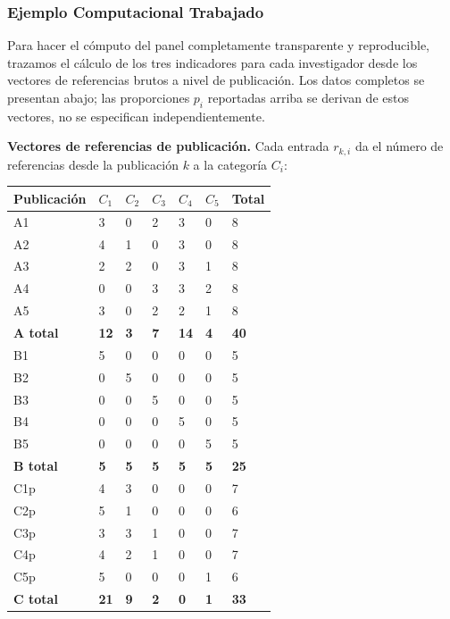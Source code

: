 \documentclass[
]{article}
\begin{document}
\hypertarget{ejemplo-computacional-trabajado}{%
\subsubsection{Ejemplo Computacional
Trabajado}\label{ejemplo-computacional-trabajado}}

Para hacer el cómputo del panel completamente transparente y
reproducible, trazamos el cálculo de los tres indicadores para cada
investigador desde los vectores de referencias brutos a nivel de
publicación. Los datos completos se presentan abajo; las proporciones
\(p_i\) reportadas arriba se derivan de estos vectores, no se
especifican independientemente.

\textbf{Vectores de referencias de publicación.} Cada entrada
\(r_{k,i}\) da el número de referencias desde la publicación \(k\) a la
categoría \(C_i\):

\begin{longtable}[]{@{}lllllll@{}}
\toprule
Publicación & \(C_1\) & \(C_2\) & \(C_3\) & \(C_4\) & \(C_5\) & Total \\
\midrule
\endhead
A1 & 3 & 0 & 2 & 3 & 0 & 8 \\
A2 & 4 & 1 & 0 & 3 & 0 & 8 \\
A3 & 2 & 2 & 0 & 3 & 1 & 8 \\
A4 & 0 & 0 & 3 & 3 & 2 & 8 \\
A5 & 3 & 0 & 2 & 2 & 1 & 8 \\
\textbf{A total} & \textbf{12} & \textbf{3} & \textbf{7} & \textbf{14} &
\textbf{4} & \textbf{40} \\
B1 & 5 & 0 & 0 & 0 & 0 & 5 \\
B2 & 0 & 5 & 0 & 0 & 0 & 5 \\
B3 & 0 & 0 & 5 & 0 & 0 & 5 \\
B4 & 0 & 0 & 0 & 5 & 0 & 5 \\
B5 & 0 & 0 & 0 & 0 & 5 & 5 \\
\textbf{B total} & \textbf{5} & \textbf{5} & \textbf{5} & \textbf{5} &
\textbf{5} & \textbf{25} \\
C1p & 4 & 3 & 0 & 0 & 0 & 7 \\
C2p & 5 & 1 & 0 & 0 & 0 & 6 \\
C3p & 3 & 3 & 1 & 0 & 0 & 7 \\
C4p & 4 & 2 & 1 & 0 & 0 & 7 \\
C5p & 5 & 0 & 0 & 0 & 1 & 6 \\
\textbf{C total} & \textbf{21} & \textbf{9} & \textbf{2} & \textbf{0} &
\textbf{1} & \textbf{33} \\
\bottomrule
\end{longtable}
\end{document}
